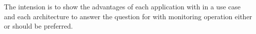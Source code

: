 The intension is to show the advantages of each application with in a use case and each architecture to answer the question for with monitoring operation either \amb or \chuk should be preferred.



